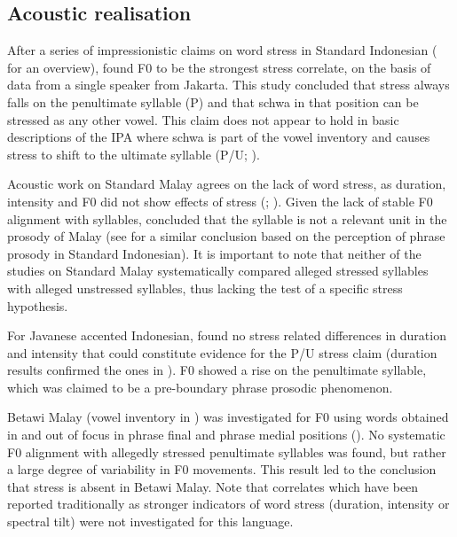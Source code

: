 
\subsection{Acoustic realisation}
After a series of impressionistic claims on word stress in Standard Indonesian (\citealt{ode_perception_1994} for an overview), \citet{laksman_location_1994} found F0 to be the strongest stress correlate, on the basis of data from a single speaker from Jakarta. This study concluded that stress always falls on the penultimate syllable (P) and that schwa in that position can be stressed as any other vowel. This claim does not appear to hold in basic descriptions of the IPA where schwa is part of the vowel inventory and causes stress to shift to the ultimate syllable (P/U; \citealt{soderberg_indonesian_2008}). \par

Acoustic work on Standard Malay agrees on the lack of word stress, as duration, intensity and F0 did not show effects of stress (\citealt{mohddon_how_2008}; \citealt{wan_instrumental_2012}). Given the lack of stable F0 alignment with syllables, \citet{mohddon_how_2008} concluded that the syllable is not a relevant unit in the prosody of Malay (see \citealt[63]{ode_perception_1994} for a similar conclusion based on the perception of phrase prosody in Standard Indonesian). It is important to note that neither of the studies on Standard Malay systematically compared alleged stressed syllables with alleged unstressed syllables, thus lacking the test of a specific stress hypothesis.\par

For Javanese accented Indonesian, \citet{goedemans_stress_2007} found no stress related differences in duration and intensity that could constitute evidence for the P/U stress claim (duration results confirmed the ones in \citealt{vanheuven_effects_1997}). F0 showed a rise on the penultimate syllable, which was claimed to be a pre-boundary phrase prosodic phenomenon. \par

Betawi Malay (vowel inventory in \citealt{ikranagara_melayu_1975}) was investigated for F0 using words obtained in and out of focus in phrase final and phrase medial positions (\citealt{vanheuven_betawi_2008}). No systematic F0 alignment with allegedly stressed penultimate syllables was found, but rather a large degree of variability in F0 movements. This result led to the conclusion that stress is absent in Betawi Malay. Note that correlates which have been reported traditionally as stronger indicators of word stress (duration, intensity or spectral tilt) were not investigated for this language.\par

